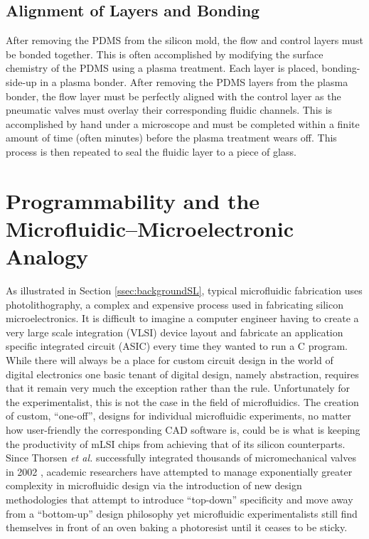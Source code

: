 \subsection{Alignment of Layers and Bonding}
After removing the PDMS from the silicon mold, the flow and control layers must be bonded together. This is often accomplished by modifying the surface chemistry of the PDMS using a plasma treatment. Each layer is placed, bonding-side-up in a plasma bonder. After removing the PDMS layers from the plasma bonder, the flow layer must be perfectly aligned with the control layer as the pneumatic valves must overlay their corresponding fluidic channels. This is accomplished by hand under a microscope and must be completed within a finite amount of time (often minutes) before the plasma treatment wears off. This process is then repeated to seal the fluidic layer to a piece of glass. 

\section{Programmability and the Microfluidic--Microelectronic Analogy}
\label{sec:backgroundCFRouting}

As illustrated in Section \ref{ssec:backgroundSL}, typical microfluidic fabrication uses photolithography, a complex and expensive process used in fabricating silicon microelectronics. It is difficult to imagine a computer engineer having to create a very large scale integration (VLSI) device layout and fabricate an application specific integrated circuit (ASIC) every time they wanted to run a C program. While there will always be a place for custom circuit design in the world of digital electronics one basic tenant of digital design, namely abstraction, requires that it remain very much the exception rather than the rule. Unfortunately for the experimentalist, this is not the case in the field of microfluidics. The creation of custom, ``one-off'', designs for individual microfluidic experiments, no matter how user-friendly the corresponding CAD software is, could be is what is keeping the productivity of mLSI chips from achieving that of its silicon counterparts. Since Thorsen \emph{et al.} successfully integrated thousands of micromechanical valves in 2002 \cite{thorsen2002}, academic researchers have attempted to manage exponentially greater complexity in microfluidic design via the introduction of new design methodologies that attempt to introduce ``top-down'' specificity and move away from a ``bottom-up'' design philosophy \cite{minhass2013}\cite{melin2007}\cite{minhass2012} yet microfluidic experimentalists still find themselves in front of an oven baking a photoresist until it ceases to be sticky. 

